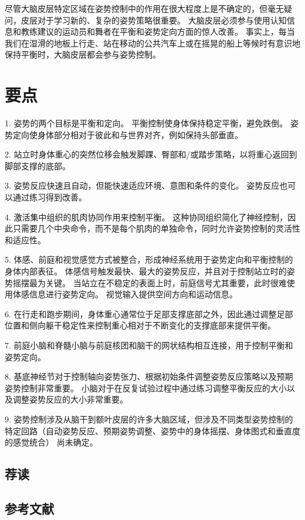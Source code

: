 尽管大脑皮层特定区域在姿势控制中的作用在很大程度上是不确定的，但毫无疑问，皮层对于学习新的、复杂的姿势策略很重要。 大脑皮层必须参与使用认知信息和教练建议的运动员和舞者在平衡和姿势定向方面的惊人改善。 事实上，每当我们在湿滑的地板上行走、站在移动的公共汽车上或在摇晃的船上等候时有意识地保持平衡时，大脑皮层都会参与姿势控制。


\section{要点}
1. 姿势的两个目标是平衡和定向。 平衡控制使身体保持稳定平衡，避免跌倒。 姿势定向使身体部分相对于彼此和与世界对齐，例如保持头部垂直。

2. 站立时身体重心的突然位移会触发脚踝、臀部和/或踏步策略，以将重心返回到脚部支撑的底部。

3. 姿势反应快速且自动，但能快速适应环境、意图和条件的变化。 姿势反应也可以通过练习得到改善。

4. 激活集中组织的肌肉协同作用来控制平衡。 这种协同组织简化了神经控制，因此只需要几个中央命令，而不是每个肌肉的单独命令，同时允许姿势控制的灵活性和适应性。

5. 体感、前庭和视觉感觉方式被整合，形成神经系统用于姿势定向和平衡控制的身体内部表征。 体感信号触发最快、最大的姿势反应，并且对于控制站立时的姿势摇摆最为关键。 当站立在不稳定的表面上时，前庭信号尤其重要，此时很难使用体感信息进行姿势定向。 视觉输入提供空间方向和运动信息。

6. 在行走和跑步期间，身体重心通常位于足部支撑底部之外，因此通过调整足部位置和侧向躯干稳定性来控制重心相对于不断变化的支撑底部来提供平衡。

7. 前庭小脑和脊髓小脑与前庭核团和脑干的网状结构相互连接，用于控制平衡和姿势定向。

8. 基底神经节对于控制轴向姿势张力、根据初始条件调整姿势反应策略以及预期姿势控制非常重要。 小脑对于在反复试验过程中通过练习调整平衡反应的大小以及调整姿势反应的大小非常重要。

9. 姿势控制涉及从脑干到额叶皮层的许多大脑区域，但涉及不同类型姿势控制的特定回路（自动姿势反应、预期姿势调整、姿势中的身体摇摆、身体图式和垂直度的感觉统合） 尚未确定。

\subsection{荐读}
\subsection{参考文献}